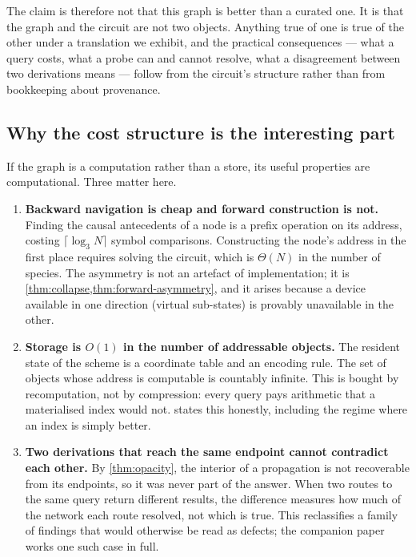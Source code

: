 \documentclass[11pt,twocolumn,a4paper]{article}
\theoremstyle{plain}
\theoremstyle{definition}
\theoremstyle{remark}
\begin{document}
The claim is therefore not that this graph is better than a curated one. It is
that the graph and the circuit are not two objects. Anything true of one is
true of the other under a translation we exhibit, and the practical consequences
--- what a query costs, what a probe can and cannot resolve, what a
disagreement between two derivations means --- follow from the circuit's
structure rather than from bookkeeping about provenance.

\subsection{Why the cost structure is the interesting part}

If the graph is a computation rather than a store, its useful properties are
computational. Three matter here.

\begin{enumerate}[label=(\roman*),leftmargin=2.2em]
\item \textbf{Backward navigation is cheap and forward construction is not.}
Finding the causal antecedents of a node is a prefix operation on its address,
costing $\lceil\log_3 N\rceil$ symbol comparisons. Constructing the node's
address in the first place requires solving the circuit, which is $\Theta(N)$ in
the number of species. The asymmetry is not an artefact of implementation; it is
\cref{thm:collapse,thm:forward-asymmetry}, and it arises because a device
available in one direction (virtual sub-states) is provably unavailable in the
other.

\item \textbf{Storage is $O(1)$ in the number of addressable objects.} The
resident state of the scheme is a coordinate table and an encoding rule. The set
of objects whose address is computable is countably infinite. This is bought by
recomputation, not by compression: every query pays arithmetic that a materialised
index would not.  states this honestly, including the regime
where an index is simply better.

\item \textbf{Two derivations that reach the same endpoint cannot contradict each
other.} By \cref{thm:opacity}, the interior of a propagation is not recoverable
from its endpoints, so it was never part of the answer. When two routes to the
same query return different results, the difference measures how much of the
network each route resolved, not which is true. This reclassifies a family of
findings that would otherwise be read as defects; the companion paper
\citep{Sachikonye2026Divergence} works one such case in full.
\end{enumerate}
\end{document}
